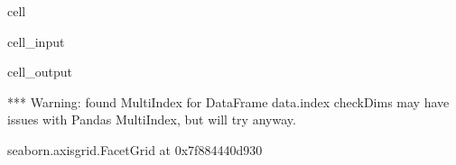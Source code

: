\documentclass[letterpaper,table,10pt,english]{jupyterBook}
\begin{document}
\begin{sphinxuseclass}{cell}\begin{sphinxVerbatimInput}

\begin{sphinxuseclass}{cell_input}
\begin{sphinxVerbatim}[commandchars=\\\{\}]
  
     
                 
                     
\end{sphinxVerbatim}

\end{sphinxuseclass}\end{sphinxVerbatimInput}
\begin{sphinxVerbatimOutput}

\begin{sphinxuseclass}{cell_output}
\begin{sphinxVerbatim}[commandchars=\\\{\}]
*** Warning: found MultiIndex for DataFrame data.index \PYGZhy{} checkDims may have issues with Pandas MultiIndex, but will try anyway.
\end{sphinxVerbatim}

\begin{sphinxVerbatim}[commandchars=\\\{\}]
\PYGZlt{}seaborn.axisgrid.FacetGrid at 0x7f884440d930\PYGZgt{}
\end{sphinxVerbatim}

\noindent{}

\end{sphinxuseclass}\end{sphinxVerbatimOutput}

\end{sphinxuseclass}
\end{document}
